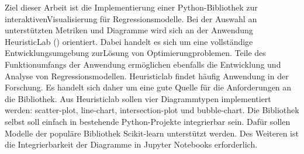 Ziel dieser Arbeit ist die Implementierung einer Python-Bibliothek zur interaktiven\linebreak Visualisierung für Regressionsmodelle. Bei der Auswahl an unterstützten Metriken und Diagramme wird sich an der Anwendung HeuristicLab (\cite{HeuristicLab}) orientiert. Dabei handelt es sich um eine vollständige Entwicklungsumgebung zur\linebreak Lösung von Optimierungproblemen. Teile des Funktionumfangs der Anwendung ermöglichen ebenfalls die Entwicklung und Analyse von Regressionsmodellen. Heuristiclab findet häufig Anwendung in der Forschung. Es handelt sich daher um eine gute Quelle für die Anforderungen an die Bibliothek. Aus Heuristiclab sollen vier Diagrammtypen implementiert werden: scatter-plot, line-chart, intersection-plot und bubble-chart. Die Bibliothek selbst soll einfach in bestehende Python-Projekte integrierbar sein. Dafür sollen Modelle der populäre Bibliothek Scikit-learn unterstützt werden. Des Weiteren ist die Integrierbarkeit der Diagramme in Jupyter Notebooks erforderlich.

